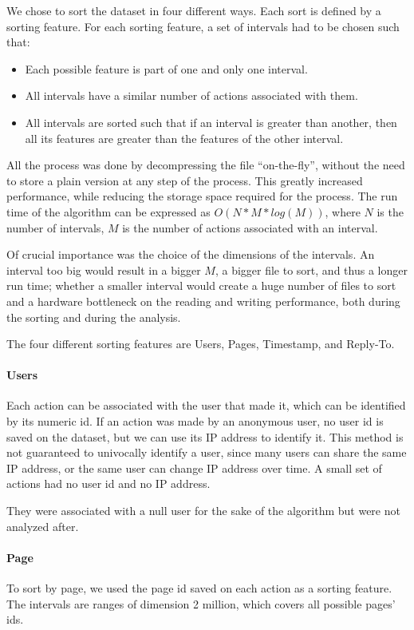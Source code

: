 We chose to sort the dataset in four different ways. Each sort is defined by a sorting feature. For each sorting feature, a set of intervals had to be chosen such that:
\begin{itemize}
\item  Each possible feature is part of one and only one interval.
\item  All intervals have a similar number of actions associated with them.
\item  All intervals are sorted such that if an interval is greater than another, then all its features are greater than the features of the other interval.
\end{itemize}

All the process was done by decompressing the file “on-the-fly”, without the need to store a plain version at any step of the process. This greatly increased performance, while reducing the storage space required for the process. The run time of the algorithm can be expressed as $O(N* M*log(M))$, where $N$ is the number of intervals, $M$ is the number of actions associated with an interval.

Of crucial importance was the choice of the dimensions of the intervals. An interval too big would result in a bigger $M$, a bigger file to sort, and thus a longer run time; whether a smaller interval would create a huge number of files to sort and a hardware bottleneck on the reading and writing performance, both during the sorting and during the analysis.

The four different sorting features are Users, Pages, Timestamp, and Reply-To.

\paragraph*{Users}
Each action can be associated with the user that made it, which can be identified by its numeric id. If an action was made by an anonymous user, no user id is saved on the dataset, but we can use its IP address to identify it. This method is not guaranteed to univocally identify a user, since many users can share the same IP address, or the same user can change IP address over time. A small set of actions had no user id and no IP address.

They were associated with a null user for the sake of the algorithm but were not analyzed after.

\paragraph*{Page}
To sort by page, we used the page id saved on each action as a sorting feature. The intervals are ranges of dimension 2 million, which covers all possible pages’ ids.


